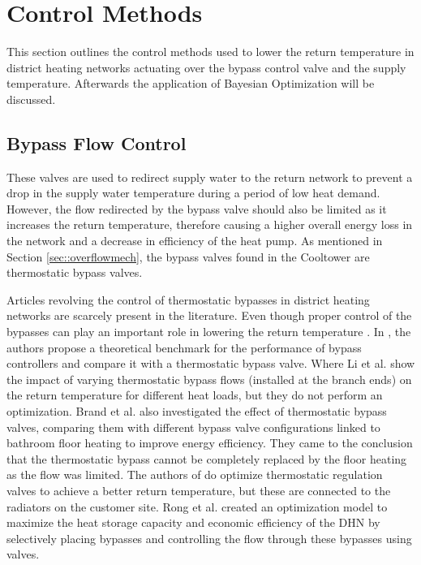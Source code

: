 \chapter{Control Methods}\label{chap::optimization}
This section outlines the control methods used to lower the return temperature in district heating networks actuating over the bypass control valve and the supply temperature. Afterwards the application of Bayesian Optimization will be discussed. 

\section{Bypass Flow Control}
These valves are used to redirect supply water to the return network to prevent a drop in the supply water temperature during a period of low heat demand. However, the flow redirected by the bypass valve should also be limited as it increases the return temperature, therefore causing a higher overall energy loss in the network and a decrease in efficiency of the heat pump. As mentioned in Section \ref{sec::overflowmech}, the bypass valves found in the Cooltower are thermostatic bypass valves. 

Articles revolving the control of thermostatic bypasses in district heating networks are scarcely present in the literature. Even though proper control of the bypasses can play an important role in lowering the return temperature \cite{app15062982,VANDERMEULEN201845}. In \cite{VANDERMEULEN201845}, the authors propose a theoretical benchmark for the performance of bypass controllers and compare it with a thermostatic bypass valve. Where Li et al. \cite{DTUlibrary} show the impact of varying thermostatic bypass flows (installed at the branch ends) on the return temperature for different heat loads, but they do not perform an optimization. Brand et al. \cite{BRAND2014256} also investigated the effect of thermostatic bypass valves, comparing them with different bypass valve configurations linked to bathroom floor heating to improve energy efficiency. They came to the conclusion that the thermostatic bypass cannot be completely replaced by the floor heating as the flow was limited. The authors of \cite{BENAKOPOULOS2021120928} do optimize thermostatic regulation valves to achieve a better return temperature, but these are connected to the radiators on the customer site. Rong et al. \cite{RONG2025116197} created an optimization model to maximize the heat storage capacity and economic efficiency of the DHN by selectively placing bypasses and controlling the flow through these bypasses using valves. 


